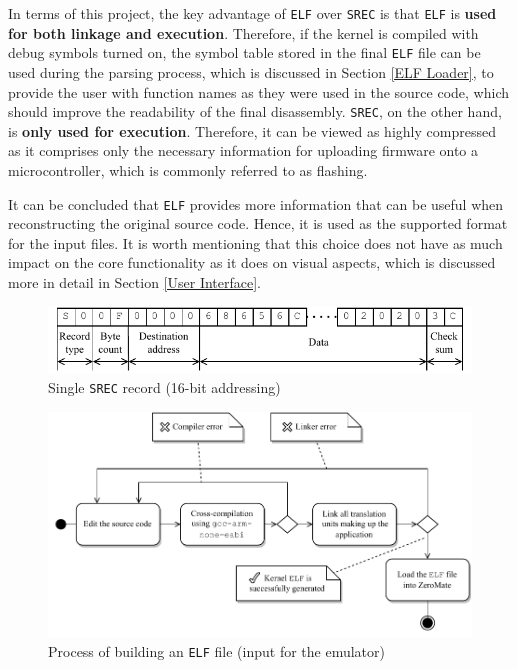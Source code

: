 \documentclass[english, ing, kiv, he, iso690numb, pdf]{fasthesis}
\begin{document}
	In terms of this project, the key advantage of \texttt{ELF} over \texttt{SREC} is that \texttt{ELF} is \textbf{used for both linkage and execution}. Therefore, if the kernel is compiled with debug symbols turned on, the symbol table stored in the final \texttt{ELF} file can be used during the parsing process, which is discussed in Section \ref{ELF Loader}, to provide the user with function names as they were used in the source code, which should improve the readability of the final disassembly. \texttt{SREC}, on the other hand, is \textbf{only used for execution}. Therefore, it can be viewed as highly compressed as it comprises only the necessary information for uploading firmware onto a microcontroller, which is commonly referred to as flashing. 
	
	It can be concluded that \texttt{ELF} provides more information that can be useful when reconstructing the original source code. Hence, it is used as the supported format for the input files. It is worth mentioning that this choice does not have as much impact on the core functionality as it does on visual aspects, which is discussed more in detail in Section \ref{User Interface}.
	
	\begin{figure}[ht]
		\centering
		\includegraphics[width=.95\textwidth]{img/diagrams/srec.pdf}
		\caption{Single \texttt{SREC} record (16-bit addressing)}
		\label{srec}
	\end{figure}
	
	\begin{figure}[ht]
		\centering
		\includegraphics[width=1.0\textwidth]{img/diagrams/kernel_build_activity_diagram.pdf}
		\caption{Process of building an \texttt{ELF} file (input for the emulator)\protect\footnotemark}
		\label{building ELF}
	\end{figure}
	
\end{document}
